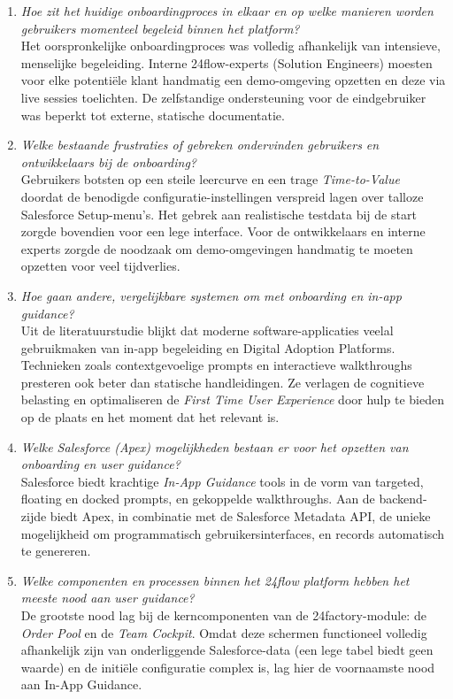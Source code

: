 \begin{enumerate}
	\item \textit{Hoe zit het huidige onboardingproces in elkaar en op welke manieren worden gebruikers momenteel begeleid binnen het platform?} \\
	
	Het oorspronkelijke onboardingproces was volledig afhankelijk van intensieve, menselijke begeleiding. Interne 24flow-experts (Solution Engineers) moesten voor elke potentiële klant handmatig een demo-omgeving opzetten en deze via live sessies toelichten. De zelfstandige ondersteuning voor de eindgebruiker was beperkt tot externe, statische documentatie.
	
	\item \textit{Welke bestaande frustraties of gebreken ondervinden gebruikers en ontwikkelaars bij de onboarding?} \\
	
	Gebruikers botsten op een steile leercurve en een trage \textit{Time-to-Value} doordat de benodigde configuratie-instellingen verspreid lagen over talloze Salesforce Setup-menu's. Het gebrek aan realistische testdata bij de start zorgde bovendien voor een lege interface. Voor de ontwikkelaars en interne experts zorgde de noodzaak om demo-omgevingen handmatig te moeten opzetten voor veel tijdverlies.
	
	\item \textit{Hoe gaan andere, vergelijkbare systemen om met onboarding en in-app guidance?} \\
	
	Uit de literatuurstudie blijkt dat moderne software-applicaties veelal gebruikmaken van in-app begeleiding en Digital Adoption Platforms. Technieken zoals contextgevoelige prompts en interactieve walkthroughs presteren ook beter dan statische handleidingen. Ze verlagen de cognitieve belasting en optimaliseren de \textit{First Time User Experience} door hulp te bieden op de plaats en het moment dat het relevant is.
	
	\item \textit{Welke Salesforce (Apex) mogelijkheden bestaan er voor het opzetten van onboarding en user guidance?} \\
	
	Salesforce biedt krachtige \textit{In-App Guidance} tools in de vorm van targeted, floating en docked prompts, en gekoppelde walkthroughs. Aan de backend-zijde biedt Apex, in combinatie met de Salesforce Metadata API, de unieke mogelijkheid om programmatisch gebruikersinterfaces, en records automatisch te genereren.
	
	\item \textit{Welke componenten en processen binnen het 24flow platform hebben het meeste nood aan user guidance?} \\
	
	De grootste nood lag bij de kerncomponenten van de 24factory-module: de \textit{Order Pool} en de \textit{Team Cockpit}. Omdat deze schermen functioneel volledig afhankelijk zijn van onderliggende Salesforce-data (een lege tabel biedt geen waarde) en de initiële configuratie complex is, lag hier de voornaamste nood aan In-App Guidance.
\end{enumerate}

